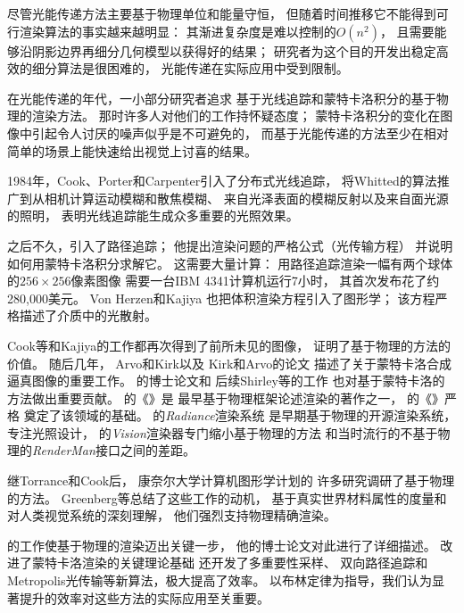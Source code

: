尽管光能传递方法主要基于物理单位和能量守恒，
但随着时间推移它不能得到可行渲染算法的事实越来越明显：
其渐进复杂度是难以控制的$O(n^2)$，
且需要能够沿阴影边界再细分几何模型以获得好的结果；
研究者为这个目的开发出稳定高效的细分算法是很困难的，
光能传递在实际应用中受到限制。

在光能传递的年代，一小部分研究者追求
基于光线追踪和蒙特卡洛积分的基于物理的渲染方法。
那时许多人对他们的工作持怀疑态度；
蒙特卡洛积分的变化在图像中引起令人讨厌的噪声似乎是不可避免的，
而基于光能传递的方法至少在相对简单的场景上能快速给出视觉上讨喜的结果。

1984年，Cook、Porter和Carpenter\parencite*{10.1145/800031.808590}引入了分布式光线追踪，
将Whitted的算法推广到从相机计算运动模糊和散焦模糊、
来自光泽表面的模糊反射以及来自面光源的照明，
表明光线追踪能生成众多重要的光照效果。

之后不久，\citet{10.1145/15922.15902}引入了路径追踪；
他提出渲染问题的严格公式（光传输方程）
并说明如何用蒙特卡洛积分求解它。
这需要大量计算：
用路径追踪渲染一幅有两个球体的$256\times256$像素图像
需要一台IBM 4341计算机运行7小时，
其首次发布花了约280,000美元\citep{farmer1981comparing}。
Von Herzen和Kajiya\parencite*{10.1145/800031.808594}
也把体积渲染方程引入了图形学；
该方程严格描述了介质中的光散射。

Cook等和Kajiya的工作都再次得到了前所未见的图像，
证明了基于物理的方法的价值。
随后几年， Arvo和Kirk\parencite*{10.1145/97879.97886}以及
Kirk和Arvo\parencite*{10.1145/122718.122735}的论文
描述了关于蒙特卡洛合成逼真图像的重要工作。
\citeauthor{10.5555/124947}的博士论文\parencite*{10.5555/124947}和
后续Shirley等\parencite*{10.1145/226150.226151}的工作
也对基于蒙特卡洛的方法做出重要贡献。
\citeauthor{10.5555/63450}的《》\parencite*{10.5555/63450}是
最早基于物理框架论述渲染的著作之一，
\citeauthor{10.5555/527570}的《》\parencite*{10.5555/527570}严格
奠定了该领域的基础。
\citet{10.1145/192161.192286}的\emph{Radiance}渲染系统
是早期基于物理的开源渲染系统，专注光照设计，
\citet{slusallek1996vision}的\emph{Vision}渲染器专门缩小基于物理的方法
和当时流行的不基于物理的\emph{RenderMan}接口之间的差距。

继Torrance和Cook后，
康奈尔大学计算机图形学计划的
许多研究调研了基于物理的方法。
Greenberg等\parencite*{10.1145/258734.258914}总结了这些工作的动机，
基于真实世界材料属性的度量和对人类视觉系统的深刻理解，
他们强烈支持物理精确渲染。

\citet{veach1997robust}的工作使基于物理的渲染迈出关键一步，
他的博士论文对此进行了详细描述。
\citeauthor{veach1997robust}改进了蒙特卡洛渲染的关键理论基础
还开发了多重要性采样、
双向路径追踪和Metropolis光传输等新算法，极大提高了效率。
以布林定律为指导，我们认为显著提升的效率对这些方法的实际应用至关重要。

